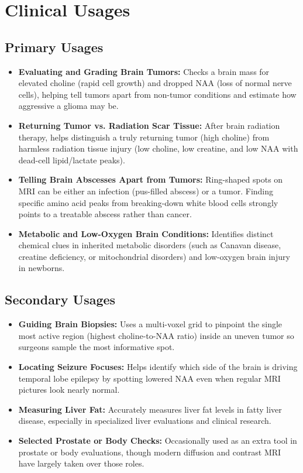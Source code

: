 \section{Clinical Usages}

\subsection{Primary Usages}
\begin{itemize}
\item \textbf{Evaluating and Grading Brain Tumors:} Checks a brain mass for elevated choline (rapid cell growth) and dropped NAA (loss of normal nerve cells), helping tell tumors apart from non-tumor conditions and estimate how aggressive a glioma may be.
\item \textbf{Returning Tumor vs. Radiation Scar Tissue:} After brain radiation therapy, helps distinguish a truly returning tumor (high choline) from harmless radiation tissue injury (low choline, low creatine, and low NAA with dead-cell lipid/lactate peaks).
\item \textbf{Telling Brain Abscesses Apart from Tumors:} Ring-shaped spots on MRI can be either an infection (pus-filled abscess) or a tumor. Finding specific amino acid peaks from breaking-down white blood cells strongly points to a treatable abscess rather than cancer.
\item \textbf{Metabolic and Low-Oxygen Brain Conditions:} Identifies distinct chemical clues in inherited metabolic disorders (such as Canavan disease, creatine deficiency, or mitochondrial disorders) and low-oxygen brain injury in newborns.
\end{itemize}

\subsection{Secondary Usages}
\begin{itemize}
\item \textbf{Guiding Brain Biopsies:} Uses a multi-voxel grid to pinpoint the single most active region (highest choline-to-NAA ratio) inside an uneven tumor so surgeons sample the most informative spot.
\item \textbf{Locating Seizure Focuses:} Helps identify which side of the brain is driving temporal lobe epilepsy by spotting lowered NAA even when regular MRI pictures look nearly normal.
\item \textbf{Measuring Liver Fat:} Accurately measures liver fat levels in fatty liver disease, especially in specialized liver evaluations and clinical research.
\item \textbf{Selected Prostate or Body Checks:} Occasionally used as an extra tool in prostate or body evaluations, though modern diffusion and contrast MRI have largely taken over those roles.
\end{itemize}

